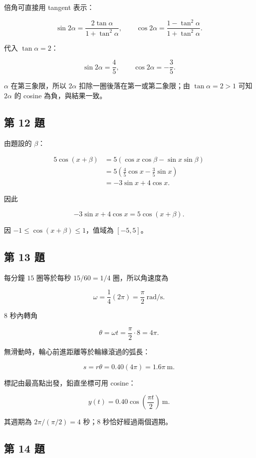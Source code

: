 \documentclass[11pt,a4paper]{article}
\begin{document}
倍角可直接用 tangent 表示：

\[
\sin2\alpha=\frac{2\tan\alpha}{1+\tan^2\alpha},
\qquad
\cos2\alpha=\frac{1-\tan^2\alpha}{1+\tan^2\alpha}.
\]

代入 \(\tan\alpha=2\)：

\[
\boxed{\sin2\alpha=\frac45},
\qquad
\boxed{\cos2\alpha=-\frac35}.
\]

\(\alpha\) 在第三象限，所以 \(2\alpha\) 扣除一圈後落在第一或第二象限；由 \(\tan\alpha=2>1\) 可知 \(2\alpha\) 的 cosine 為負，與結果一致。

\subsection{第 12 題}\label{ux7b2c-12-ux984c}

由題設的 \(\beta\)：

\[
\begin{aligned}
5\cos(x+\beta)
&=5(\cos x\cos\beta-\sin x\sin\beta)\\
&=5\left(\frac45\cos x-\frac35\sin x\right)\\
&=-3\sin x+4\cos x.
\end{aligned}
\]

因此

\[
\boxed{-3\sin x+4\cos x=5\cos(x+\beta)}.
\]

因 \(-1\le\cos(x+\beta)\le1\)，值域為 \(\boxed{[-5,5]}\)。

\subsection{第 13 題}\label{ux7b2c-13-ux984c}

每分鐘 \(15\) 圈等於每秒 \(15/60=1/4\) 圈，所以角速度為

\[
\omega=\frac14(2\pi)=\boxed{\frac\pi2\ \mathrm{rad/s}}.
\]

\(8\) 秒內轉角

\[
\theta=\omega t=\frac\pi2\cdot8=4\pi.
\]

無滑動時，輪心前進距離等於輪緣滾過的弧長：

\[
s=r\theta=0.40(4\pi)=\boxed{1.6\pi\ \mathrm m}.
\]

標記由最高點出發，鉛直坐標可用 cosine：

\[
\boxed{y(t)=0.40\cos\left(\frac{\pi t}{2}\right)\ \mathrm m}.
\]

其週期為 \(2\pi/(\pi/2)=4\) 秒；\(8\) 秒恰好經過兩個週期。

\subsection{第 14 題}\label{ux7b2c-14-ux984c}
\end{document}
